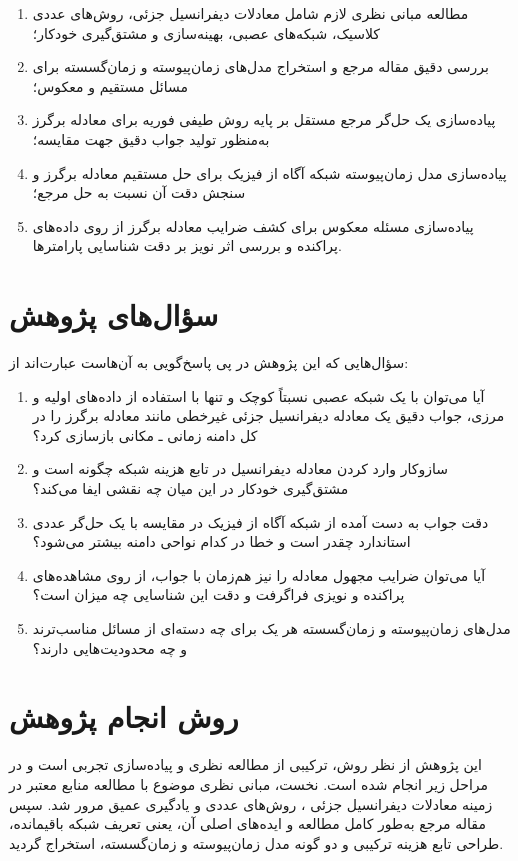 \begin{enumerate}
\item مطالعه مبانی نظری لازم شامل معادلات دیفرانسیل جزئی، روش‌های عددی
کلاسیک، شبکه‌های عصبی، بهینه‌سازی و مشتق‌گیری خودکار؛
\item بررسی دقیق مقاله مرجع و استخراج مدل‌های زمان‌پیوسته و زمان‌گسسته برای
مسائل مستقیم و معکوس؛
\item پیاده‌سازی یک حل‌گر مرجع مستقل بر پایه روش طیفی فوریه برای معادله
برگرز به‌منظور تولید جواب دقیق جهت مقایسه؛
\item پیاده‌سازی مدل زمان‌پیوسته شبکه آگاه از فیزیک برای حل مستقیم معادله
برگرز و سنجش دقت آن نسبت به حل مرجع؛
\item پیاده‌سازی مسئله معکوس برای کشف ضرایب معادله برگرز از روی داده‌های
پراکنده و بررسی اثر نویز بر دقت شناسایی پارامترها.
\end{enumerate}

\section{سؤال‌های پژوهش}
\label{sec:questions}

سؤال‌هایی که این پژوهش در پی پاسخ‌گویی به آن‌هاست عبارت‌اند از:

\begin{enumerate}
\item آیا می‌توان با یک شبکه عصبی نسبتاً کوچک و تنها با استفاده از داده‌های
اولیه و مرزی، جواب دقیق یک معادله دیفرانسیل جزئی غیرخطی مانند معادله برگرز
را در کل دامنه زمانی ـ مکانی بازسازی کرد؟
\item سازوکار وارد کردن معادله دیفرانسیل در تابع هزینه شبکه چگونه است و
مشتق‌گیری خودکار در این میان چه نقشی ایفا می‌کند؟
\item دقت جواب به دست آمده از شبکه آگاه از فیزیک در مقایسه با یک حل‌گر عددی
استاندارد چقدر است و خطا در کدام نواحی دامنه بیشتر می‌شود؟
\item آیا می‌توان ضرایب مجهول معادله را نیز هم‌زمان با جواب، از روی
مشاهده‌های پراکنده و نویزی فراگرفت و دقت این شناسایی چه میزان است؟
\item مدل‌های زمان‌پیوسته و زمان‌گسسته هر یک برای چه دسته‌ای از مسائل
مناسب‌ترند و چه محدودیت‌هایی دارند؟
\end{enumerate}

\section{روش انجام پژوهش}
\label{sec:methodology}

این پژوهش از نظر روش، ترکیبی از مطالعه نظری و پیاده‌سازی تجربی است و در
مراحل زیر انجام شده است. نخست، مبانی نظری موضوع با مطالعه منابع معتبر در
زمینه معادلات دیفرانسیل جزئی \cite{evans2010}، روش‌های عددی
\cite{leveque2007} و یادگیری عمیق \cite{goodfellow2016} مرور شد. سپس مقاله
مرجع \cite{raissi2019} به‌طور کامل مطالعه و ایده‌های اصلی آن، یعنی تعریف
شبکه باقیمانده، طراحی تابع هزینه ترکیبی و دو گونه مدل زمان‌پیوسته و
زمان‌گسسته، استخراج گردید.

